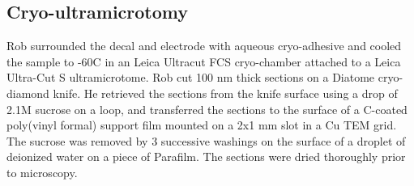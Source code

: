 \subsection{Cryo-ultramicrotomy}

Rob surrounded the decal and electrode with aqueous
cryo-adhesive and cooled the sample
to -60\degree C in an Leica Ultracut FCS cryo-chamber
attached to a Leica Ultra-Cut S ultramicrotome. Rob
cut 100 nm thick sections on a Diatome cryo-diamond
knife. He retrieved the sections from the knife surface
using a drop of 2.1M sucrose on a loop, and transferred
the sections to the surface of a C-coated poly(vinyl
formal) support film mounted on a 2x1 mm slot in a Cu
TEM grid. The sucrose was removed by 3 successive washings
on the surface of a droplet of deionized water on a
piece of Parafilm. The sections were dried thoroughly
prior to microscopy.

\endinput
